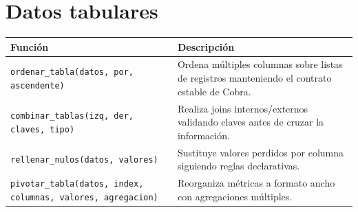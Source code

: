 \documentclass{article}
\begin{document}
\section*{Datos tabulares}
\begin{tabular}{ll}
\textbf{Función} & \textbf{Descripción}\\\hline
\texttt{ordenar\_tabla(datos, por, ascendente)} & Ordena múltiples columnas sobre listas de registros manteniendo el contrato estable de Cobra.\\
\texttt{combinar\_tablas(izq, der, claves, tipo)} & Realiza joins internos/externos validando claves antes de cruzar la información.\\
\texttt{rellenar\_nulos(datos, valores)} & Sustituye valores perdidos por columna siguiendo reglas declarativas.\\
\texttt{pivotar\_tabla(datos, index, columnas, valores, agregacion)} & Reorganiza métricas a formato ancho con agregaciones múltiples.\\
\end{tabular}
\end{document}

